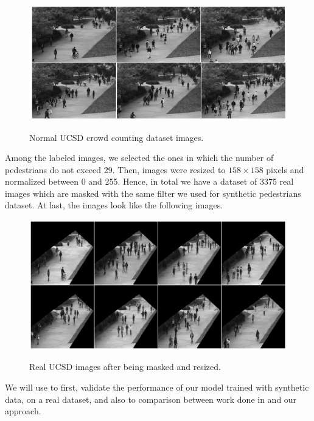 \begin{figure}[H]
	\centering
	{\includegraphics[width=1\textwidth]{images/normalucsd}}
	\caption{Normal UCSD crowd counting dataset images.}
	\label{fig:pers}
\end{figure}

\indent Among the labeled images, we selected the ones in which the number of pedestrians do not exceed 29. Then, images were resized to  $158\times158$ pixels and normalized between 0 and 255. Hence, in total we have a dataset of 3375 real images which are masked with the same filter we used for synthetic pedestrians dataset. At last, the images look like the following images.

\begin{figure}[H]
	\centering
	{\includegraphics[width=1\textwidth]{images/testucsd}}
	\caption{Real UCSD images after being masked and resized.}
	\label{fig:testucsd}
\end{figure}


\indent We will use to first, validate the performance of our model trained with synthetic data, on a real dataset, and also to comparison between work done in \cite{chan2008privacy} and our approach. 